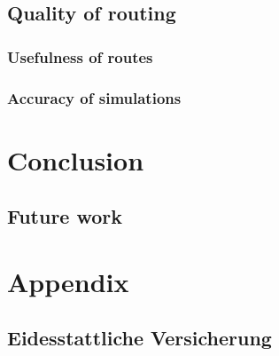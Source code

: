 \documentclass[
	11pt,
	a4paper,
	usegeometry,
	twoside,
	openright,
	toc=chapterentrywithdots
]{scrbook}
\begin{document}
		\section{Quality of routing}
		
			\subsection{Usefulness of routes}
			
			
			\subsection{Accuracy of simulations}
		
	
	\chapter{Conclusion}
	
		\section{Future work}
		
	\printbibliography

	\printindex
	
	\chapter*{Appendix}
	
		\clearpage
		\section*{Eidesstattliche Versicherung}
		
\end{document}
